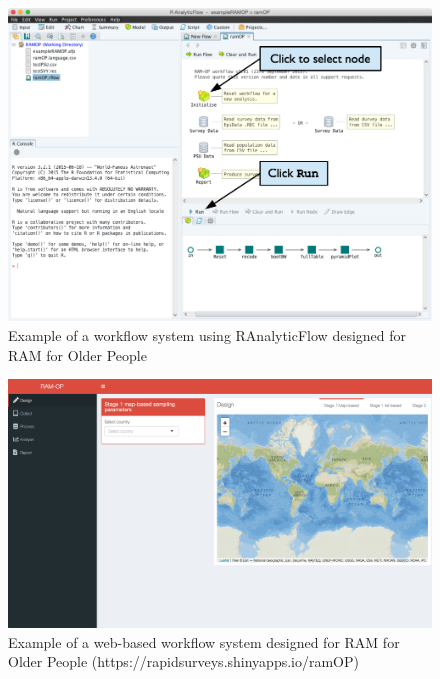 \documentclass[12pt,a4paper]{article}
\begin{document}
\begin{figure}

{\centering \includegraphics[width=13.89in]{figures/runWorkflowRAF} 

}

\caption{Example of a workflow system using RAnalyticFlow designed for RAM for Older People}\label{fig:workflow1}
\end{figure}

\begin{figure}[H]

{\centering \includegraphics[width=0.9\linewidth]{figures/webWorkflow} 

}

\caption{Example of a web-based workflow system designed for RAM for Older People (https://rapidsurveys.shinyapps.io/ramOP)}\label{fig:workflow2}
\end{figure}


\end{document}
